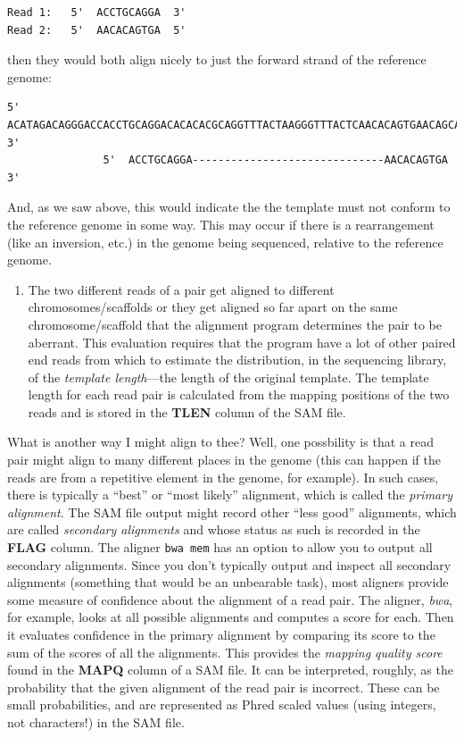 \documentclass[]{krantz}
\providecommand{\tightlist}{%
  \setlength{\itemsep}{0pt}\setlength{\parskip}{0pt}}
\begin{document}
\begin{verbatim}
Read 1:   5'  ACCTGCAGGA  3'
Read 2:   5'  AACACAGTGA  5'
\end{verbatim}

then they would both align nicely to just the forward strand of the reference genome:

\begin{verbatim}
5'  ACATAGACAGGGACCACCTGCAGGACACACACGCAGGTTTACTAAGGGTTTACTCAACACAGTGAACAGCATATACCAGA  3'
               5'  ACCTGCAGGA------------------------------AACACAGTGA  3'
\end{verbatim}

And, as we saw above, this would indicate the the template must not
conform to the reference genome in some way.
This may occur if there is a rearrangement (like an inversion, etc.) in the
genome being sequenced, relative to the reference genome.

\begin{enumerate}
\def\labelenumi{(\arabic{enumi})}
\setcounter{enumi}{2}
\tightlist
\item
  The two different reads of a pair get aligned to different chromosomes/scaffolds or
  they get aligned so far apart on the same chromosome/scaffold that the alignment program
  determines the pair to be aberrant. This evaluation requires that the program have
  a lot of other paired end reads from which to estimate the distribution, in the sequencing library,
  of the \emph{template length}---the length of the original template. The template length
  for each read pair is calculated from the mapping positions of the two reads and
  is stored in the \textbf{TLEN} column of the SAM file.
\end{enumerate}

What is another way I might align to thee? Well, one possbility is that a read pair
might align to many different places in the genome (this can happen if the reads are from
a repetitive element in the genome, for example). In such cases, there is typically
a ``best'' or ``most likely'' alignment, which is called the \emph{primary alignment}. The SAM
file output might record other ``less good'' alignments, which are called \emph{secondary alignments}
and whose status as such is recorded in the \textbf{FLAG} column. The aligner \texttt{bwa\ mem} has an
option to allow you to output all secondary alignments. Since you don't typically output and inspect
all secondary alignments (something that would be an unbearable task), most aligners
provide some measure of confidence about the alignment of a read pair. The aligner, \emph{bwa}, for example,
looks at all possible alignments and computes a score for each. Then it evaluates confidence
in the primary alignment by comparing its score to the sum of the scores of all the alignments.
This provides the \emph{mapping quality score} found in the
\textbf{MAPQ} column of a SAM file. It can be interpreted, roughly, as the probability that
the given alignment of the read pair is incorrect. These can be small probabilities,
and are represented as Phred scaled values (using integers, not characters!) in the
SAM file.
\end{document}
